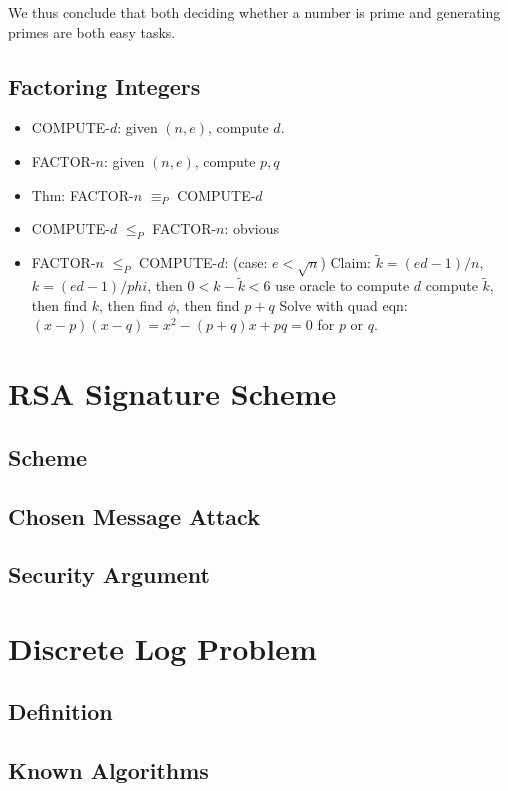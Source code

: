 \documentclass[12pt]{article}
\begin{document}
We thus conclude that both deciding whether a number is prime and generating primes are both easy tasks.

\subsection{Factoring Integers}

\begin{itemize}
\item COMPUTE-$d$: given $(n,e)$, compute $d$.
\item FACTOR-$n$: given $(n,e)$, compute $p,q$
\item Thm: FACTOR-$n$ $\equiv_P$ COMPUTE-$d$
\item COMPUTE-$d$ $\le_P$ FACTOR-$n$: obvious
\item FACTOR-$n$ $\le_P$ COMPUTE-$d$: (case: $e < \sqrt{n}$)
\subitem Claim: $\tilde{k} = (ed-1)/n$, $k = (ed-1)/phi$, then $0 < k - \tilde{k} < 6$
\subitem use oracle to compute $d$
\subitem compute $\tilde{k}$, then find $k$, then find $\phi$, then find $p+q$
\subitem Solve with quad eqn: $(x-p)(x-q) = x^2 - (p+q)x + pq = 0$ for $p$ or $q$.
\end{itemize}

\section{RSA Signature Scheme}
\subsection{Scheme}
\subsection{Chosen Message Attack}
\subsection{Security Argument}

\section{Discrete Log Problem}
\subsection{Definition}
\subsection{Known Algorithms}
\end{document}
